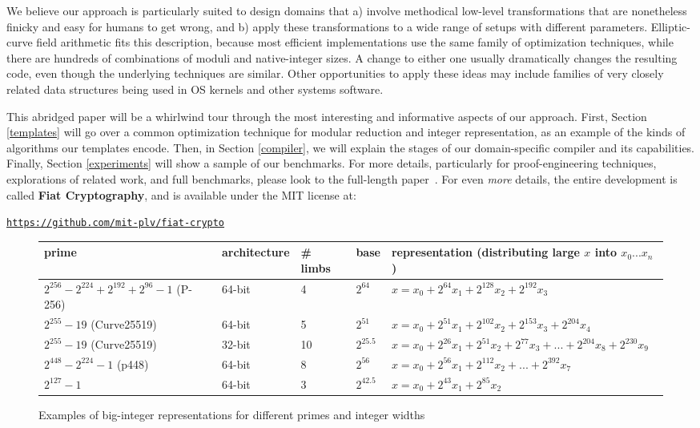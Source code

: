 \documentclass[letterpaper,twocolumn,10pt]{article}
\begin{document}
We believe our approach is particularly suited to design domains that a) involve methodical low-level transformations that are nonetheless finicky and easy for humans to get wrong, and b) apply these transformations to a wide range of setups with different parameters.
Elliptic-curve field arithmetic fits this description, because most efficient implementations use the same family of optimization techniques, while there are hundreds of combinations of moduli and native-integer sizes.
A change to either one usually dramatically changes the resulting code, even though the underlying techniques are similar.
Other opportunities to apply these ideas may include families of very closely related data structures being used in OS kernels and other systems software.

This abridged paper will be a whirlwind tour through the most interesting and informative aspects of our approach.
First, Section \ref{templates} will go over a common optimization technique for modular reduction and integer representation, as an example of the kinds of algorithms our templates encode.
Then, in Section \ref{compiler}, we will explain the stages of our domain-specific compiler and its capabilities.
Finally, Section \ref{experiments} will show a sample of our benchmarks.
For more details, particularly for proof-engineering techniques, explorations of related work, and full benchmarks, please look to the full-length paper~\cite{FiatCryptoSP19}.
For even \emph{more} details, the entire development is called \textbf{Fiat Cryptography}, and is available under the MIT license at:
\begin{center}
  \texttt{\url{https://github.com/mit-plv/fiat-crypto}}
\end{center}

\begin{figure*}
  \begin{tabular}{|p{4cm}|l|l|l|l|}
\hline
    prime & architecture & \# limbs & base & representation (distributing large $x$ into $x_0...x_n$)\\
\hline
    $2^{256} - 2^{224} + 2^{192} + 2^{96} - 1$ (P-256) & 64-bit & 4 & $2^{64}$ & $x = x_0 + 2^{64}x_1 + 2^{128}x_2 + 2^{192}x_3$ \\
\hline
  $2^{255}-19$ (Curve25519) & 64-bit & 5 & $2^{51}$ & $x = x_0 + 2^{51}x_1 + 2^{102}x_2 + 2^{153}x_3 + 2^{204}x_4$ \\
\hline
  $2^{255}-19$ (Curve25519) & 32-bit & 10 & $2^{25.5}$ & $x = x_0 + 2^{26}x_1 + 2^{51}x_2 + 2^{77}x_3 + ... + 2^{204}x_8 + 2^{230}x_9$ \\
\hline
  $2^{448} - 2^{224} - 1$ (p448) & 64-bit & 8 & $2^{56}$ & $x = x_0 + 2^{56}x_1 + 2^{112}x_2 + ... + 2^{392}x_7$ \\
\hline
    $2^{127} - 1$ & 64-bit & 3 & $2^{42.5}$ & $x = x_0 + 2^{43}x_1 + 2^{85}x_2$ \\
\hline
\end{tabular}
  \caption{\label{fig:representationexamples}Examples of big-integer representations for different primes and integer widths}
\end{figure*}
\end{document}
